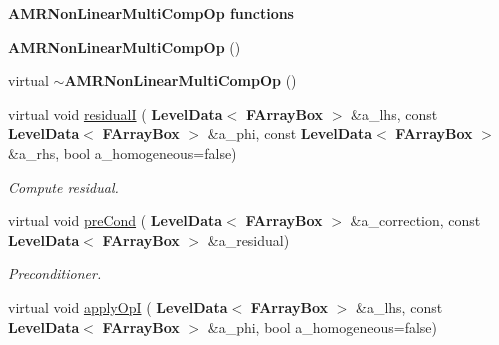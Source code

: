 \begin{Indent}\textbf{ A\+M\+R\+Non\+Linear\+Multi\+Comp\+Op functions}\par
\begin{DoxyCompactItemize}
\item 
\mbox{\label{class_a_m_r_non_linear_multi_comp_op_a2205291922bf767821fcbeb13f52a338}} 
{\bfseries A\+M\+R\+Non\+Linear\+Multi\+Comp\+Op} ()
\item 
\mbox{\label{class_a_m_r_non_linear_multi_comp_op_a6f358cdb028df9d5a9d274fda7c77a77}} 
virtual {\bfseries $\sim$\+A\+M\+R\+Non\+Linear\+Multi\+Comp\+Op} ()
\item 
\mbox{\label{class_a_m_r_non_linear_multi_comp_op_a8c6014f3d9208f5184d09d700876335b}} 
virtual void \hyperlink{class_a_m_r_non_linear_multi_comp_op_a8c6014f3d9208f5184d09d700876335b}{residualI} (\textbf{ Level\+Data}$<$ \textbf{ F\+Array\+Box} $>$ \&a\+\_\+lhs, const \textbf{ Level\+Data}$<$ \textbf{ F\+Array\+Box} $>$ \&a\+\_\+phi, const \textbf{ Level\+Data}$<$ \textbf{ F\+Array\+Box} $>$ \&a\+\_\+rhs, bool a\+\_\+homogeneous=false)
\begin{DoxyCompactList}\small\item\em Compute residual. \end{DoxyCompactList}\item 
\mbox{\label{class_a_m_r_non_linear_multi_comp_op_aef99970c9405719bde322dde73ba1aff}} 
virtual void \hyperlink{class_a_m_r_non_linear_multi_comp_op_aef99970c9405719bde322dde73ba1aff}{pre\+Cond} (\textbf{ Level\+Data}$<$ \textbf{ F\+Array\+Box} $>$ \&a\+\_\+correction, const \textbf{ Level\+Data}$<$ \textbf{ F\+Array\+Box} $>$ \&a\+\_\+residual)
\begin{DoxyCompactList}\small\item\em Preconditioner. \end{DoxyCompactList}\item 
\mbox{\label{class_a_m_r_non_linear_multi_comp_op_a8313cc6520e242cfc9eb796038268bb6}} 
virtual void \hyperlink{class_a_m_r_non_linear_multi_comp_op_a8313cc6520e242cfc9eb796038268bb6}{apply\+OpI} (\textbf{ Level\+Data}$<$ \textbf{ F\+Array\+Box} $>$ \&a\+\_\+lhs, const \textbf{ Level\+Data}$<$ \textbf{ F\+Array\+Box} $>$ \&a\+\_\+phi, bool a\+\_\+homogeneous=false)

\end{DoxyCompactItemize}
\end{Indent}
